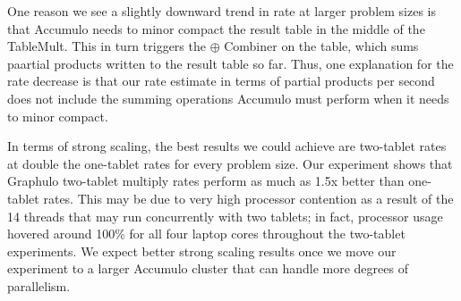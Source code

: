 One reason we see a slightly downward trend in rate at larger problem sizes is that Accumulo
needs to minor compact the result table in the middle of the TableMult. This in turn triggers 
the $\oplus$ Combiner on the table, which sums paartial products written to the result table so far.
Thus, one explanation for the rate decrease is that 
our rate estimate in terms of partial products per second does not include the summing operations
Accumulo must perform when it needs to minor compact.

In terms of strong scaling, the best results we could achieve are two-tablet rates
at double the one-tablet rates for every problem size.
Our experiment shows that Graphulo two-tablet multiply rates perform as much as 1.5x better
than one-tablet rates.  This may be due to very high processor contention as a result of 
the 14 threads that may run concurrently with two tablets; in fact,
processor usage hovered around 100\% for all four laptop cores throughout the two-tablet experiments.
We expect better strong scaling results once we move our experiment 
to a larger Accumulo cluster that can handle more degrees of parallelism.


